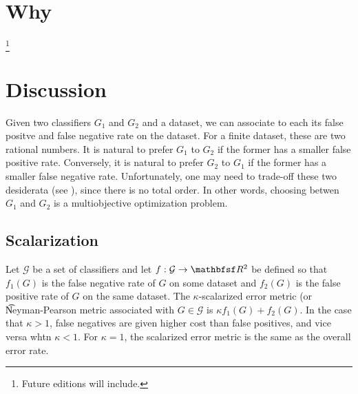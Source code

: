 
\section*{Why}
\footnote{Future editions will include.}
\section*{Discussion}

Given two classifiers $G_1$ and $G_2$ and a dataset, we can associate to each its false positve and false negative rate on the dataset.
For a finite dataset, these are two rational numbers.
It is natural to prefer $G_1$ to $G_2$ if the former has a smaller false positive rate.
Conversely, it is natural to prefer $G_2$ to $G_1$ if the former has a smaller false negative rate.
Unfortunately, one may need to trade-off these two desiderata (see ), since there is no total order.
In other words, choosing betwen $G_1$ and $G_2$ is a multiobjective optimization problem.

\subsection*{Scalarization}

Let $\mathcal{G} $ be a set of classifiers and let $f: \mathcal{G}  \to \R ^2$ be defined so that $f_1(G)$ is the false negative rate of $G$ on some dataset and $f_2(G)$ is the false positive rate of $G$ on the same dataset.
The \t{$\kappa $-scalarized error metric} (or \t{Neyman-Pearson metric} associated with $G \in \mathcal{G} $ is $\kappa  f_1(G) + f_2(G)$.
In the case that $\kappa  > 1$, false negatives are given higher cost than false positives, and vice versa whtn $\kappa  < 1$.
For $\kappa  = 1$, the scalarized error metric is the same as the overall error rate.

\blankpage